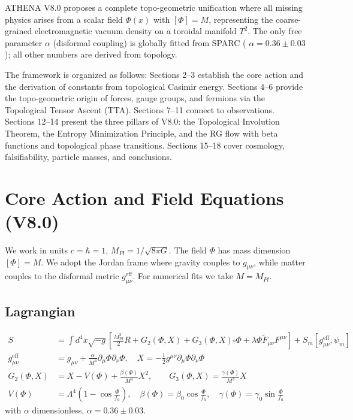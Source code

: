 \documentclass[11pt,a4paper]{article}
\begin{document}
ATHENA V8.0 proposes a complete topo-geometric unification where all missing physics arises from a scalar field \(\Phi (x)\) with \([\Phi ] = M\), representing the coarse-grained electromagnetic vacuum density on a toroidal manifold \(T^2\). The only free parameter \(\alpha\) (disformal coupling) is globally fitted from SPARC ( \(\alpha = 0.36 \pm 0.03\) ); all other numbers are derived from topology.

The framework is organized as follows: Sections 2--3 establish the core action and the derivation of constants from topological Casimir energy. Sections 4--6 provide the topo-geometric origin of forces, gauge groups, and fermions via the Topological Tensor Ascent (TTA). Sections 7--11 connect to observations. Sections 12--14 present the three pillars of V8.0: the Topological Involution Theorem, the Entropy Minimization Principle, and the RG flow with beta functions and topological phase transitions. Sections 15--18 cover cosmology, falsifiability, particle masses, and conclusions.

\section{Core Action and Field Equations (V8.0)}
We work in units \(c = \hbar = 1\), \(M_{Pl} = 1 / \sqrt{8\pi G}\). The field \(\Phi\) has mass dimension \([\Phi ] = M\). We adopt the Jordan frame where gravity couples to \(g_{\mu \nu}\), while matter couples to the disformal metric \(g_{\mu \nu}^{\mathrm{eff}}\). For numerical fits we take \(M = M_{Pl}\).

\subsection{Lagrangian}
\begin{align}
S &= \int d^{4}x\sqrt{-g}\left[\frac{M_{\mathrm{Pl}}^{2}}{2} R + G_{2}(\Phi ,X) + G_{3}(\Phi ,X)\square \Phi +\lambda \Phi \tilde{F}_{\mu \nu}F^{\mu \nu}\right] + S_{m}[g_{\mu \nu}^{\mathrm{eff}},\psi_{m}] \tag{1}\\
g_{\mu \nu}^{\mathrm{eff}} &= g_{\mu \nu} + \frac{\alpha}{M^4}\partial_{\mu}\Phi \partial_{\nu}\Phi ,\quad X = -\frac{1}{2} g^{\mu \nu}\partial_{\mu}\Phi \partial_{\nu}\Phi \tag{2}\\
G_{2}(\Phi ,X) &= X - V(\Phi) + \frac{\beta(\Phi)}{M^{4}} X^{2},\qquad G_{3}(\Phi ,X) = \frac{\gamma(\Phi)}{M^{3}} X \tag{3}\\
V(\Phi) &= \Lambda^{4}\left(1 - \cos \frac{\Phi}{f_{a}}\right),\quad \beta (\Phi) = \beta_{0}\cos \frac{\Phi}{f_{a}},\quad \gamma (\Phi) = \gamma_{0}\sin \frac{\Phi}{f_{a}} \tag{4}
\end{align}
with \(\alpha\) dimensionless, \(\alpha = 0.36 \pm 0.03\).
\end{document}
